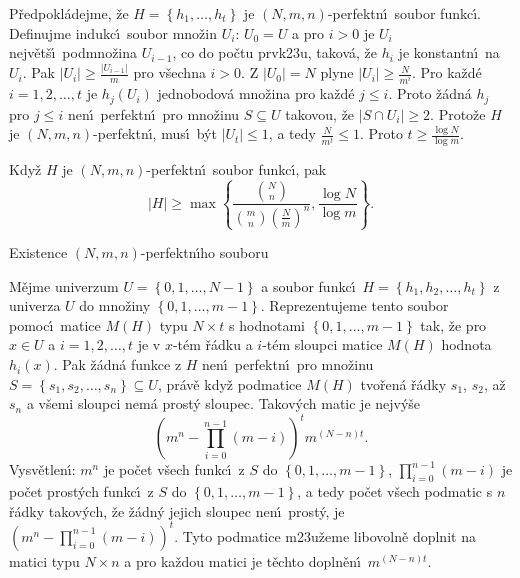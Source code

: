 \flushpar P\v redpokl\'adejme, \v ze $H=\left\{h_1,\dots,h_t\right\}$ je 
$\left(N,m,n\right)$-perfektn\'\i\ soubor funkc\'\i .  Definujme indukc\'\i\ 
soubor mno\v zin $U_i$:\newline 
$U_0=U$ a pro 
$i>0$ je $U_i$ nejv\v et\v s\'\i\ podmno\v zina $U_{i-1}$, co do po\v ctu 
prvk\accent23u, 
takov\'a, \v ze $h_i$ je konstantn\'\i\ na $U_i$.  Pak $|U_i|\ge\frac {
|U_{i-1}|}m$ 
pro v\v sechna $i>0$.  Z $|U_0|=N$ plyne $|U_i|\ge\frac N{m^i}$.  Pro ka\v zd\'e 
$i=1,2,\dots,t$ je $h_j\left(U_i\right)$ jednobodov\'a mno\v zina pro ka\v zd\'e 
$j\le i$.  Proto \v z\'adn\'a $h_j$ pro $j\le i$ nen\'\i\ perfektn\'\i\ pro 
mno\v zinu $S\subseteq U$ takovou, \v ze $|S\cap U_i|\ge 2$.  Proto\v ze $
H$ je 
$\left(N,m,n\right)$-perfektn\'\i , mus\'\i\ b\'yt $|U_t|\le 1$, a tedy $\frac 
N{m^t}\le 1$.  Proto 
$t\ge\frac {\log N}{\log m}$.    
\medskip

Kdy\v z $H$ je $\left(N,m,n\right)$-perfektn\'\i\ soubor 
funkc\'\i , pak 
$$|H|\ge\max\left\{\frac {\binom Nn}{\binom mn\left(\frac Nm\right)^n},\frac {\log 
N}{\log m}\right\}.$$
\endproclaim

\subhead
Existence $\left(N,m,n\right)$-perfektn\'\i ho souboru
\endsubhead
\smallskip

\flushpar M\v ejme univerzum $U=\left\{0,1,\dots,N-1\right\}$ a soubor 
funkc\'\i\ $H=\left\{h_1,h_2,\dots,h_t\right\}$ z univerza $U$ do mno\v ziny 
$\left\{0,1,\dots,m-1\right\}$.  Reprezentujeme tento soubor pomoc\'\i\ 
matice $M\left(H\right)$ typu $N\times t$ s hodnotami $\left\{0,1,\dots,m-1\right\}$ tak, 
\v ze pro $x\in U$ a $i=1,2,\dots,t$ je 
v $x$-t\'em \v r\'adku a $i$-t\'em sloupci matice $M\left(H\right)$ 
hodnota $h_i\left(x\right)$. Pak \v z\'adn\'a funkce z $H$ 
nen\'\i\ perfektn\'\i\ pro mno\v zinu $S=\left\{s_1,s_2,\dots,s_n\right\}\subseteq 
U$, 
pr\'av\v e kdy\v z podmatice $M\left(H\right)$ tvo\v re\-n\'a 
\v r\'adky $s_1$, $s_2$, a\v z $s_n$ a v\v semi sloupci nem\'a prost\'y sloupec. 
Ta\-ko\-v\'ych matic je nejv\'y\v se 
$$\left(m^n-\prod_{i=0}^{n-1}\left(m-i\right)\right)^tm^{\left(N-n\right)t}.$$
\flushpar Vysv\v etlen\'\i :  $m^n$ je po\v cet v\v sech funkc\'\i\ z $
S$ do 
$\left\{0,1,\dots,m-1\right\}$, $\prod_{i=0}^{n-1}\left(m-i\right)$ je po\v cet prost\'ych funkc\'\i\ z $
S$ 
do $\left\{0,1,\dots,m-1\right\}$, a tedy po\v cet v\v sech podmatic s $n$ 
\v r\'adky takov\'ych, \v ze \v z\'adn\'y jejich sloupec nen\'\i\ prost\'y, je 
$\left(m^n-\prod_{i=0}^{n-1}\left(m-i\right)\right)^t$.  Tyto podmatice m\accent23u\v zeme 
libovoln\v e doplnit na matici typu $N\times n$ a pro ka\v zdou 
matici je t\v echto dopln\v en\'\i\ $m^{\left(N-n\right)t}$.  
\medskip

